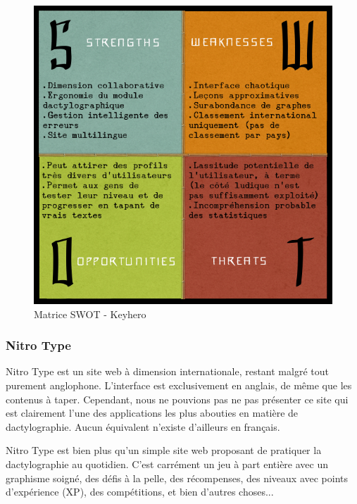 \documentclass[a4paper,12pt]{article}
\begin{document}
\begin{figure}
\begin{center}
\includegraphics[scale=0.5]{swot-keyhero.png}
\end{center}
\caption{Matrice SWOT - Keyhero}
\end{figure}

\newpage

\subsubsection{Nitro Type}

Nitro Type est un site web à dimension internationale, restant malgré tout purement anglophone. L'interface est exclusivement en anglais, de même que les contenus à taper. Cependant, nous ne pouvions pas ne pas présenter ce site qui est clairement l'une des applications les plus abouties en matière de dactylographie. Aucun équivalent n'existe d'ailleurs en français.

Nitro Type est bien plus qu'un simple site web proposant de pratiquer la dactylographie au quotidien. C'est carrément un jeu à part entière avec un graphisme soigné, des défis à la pelle, des récompenses, des niveaux avec points d'expérience (XP), des compétitions, et bien d'autres choses...
\end{document}
